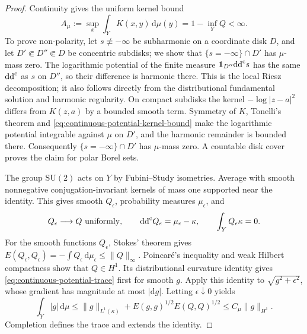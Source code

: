 \begin{proof}
Continuity gives the uniform kernel bound
\begin{equation}\label{eq:continuous-potential-kernel-bound}
 A_\mu:=\sup_x\int_YK(x,y)\,\mathrm d\mu(y)
       =1-\inf_YQ<\infty.
\end{equation}
To prove non-polarity, let $s\not\equiv-\infty$ be subharmonic on a coordinate disk $D$, and let $D'\Subset D''\Subset D$ be concentric subdisks; we show that $\{s=-\infty\}\cap D'$ has $\mu$-mass zero. The logarithmic potential of the finite measure $\mathbf1_{D''}\mathrm{dd}^{\mathrm{c}} s$ has the same $\mathrm{dd}^{\mathrm{c}}$ as $s$ on $D''$, so their difference is harmonic there. This is the local Riesz decomposition; it also follows directly from the distributional fundamental solution and harmonic regularity. On compact subdisks the kernel $-\log|z-a|^2$ differs from $K(z,a)$ by a bounded smooth term. Symmetry of $K$, Tonelli's theorem and \eqref{eq:continuous-potential-kernel-bound} make the logarithmic potential integrable against $\mu$ on $D'$, and the harmonic remainder is bounded there. Consequently $\{s=-\infty\}\cap D'$ has $\mu$-mass zero. A countable disk cover proves the claim for polar Borel sets.

The group $\mathrm{SU}(2)$ acts on $Y$ by Fubini--Study isometries. Average with smooth nonnegative conjugation-invariant kernels of mass one supported near the identity. This gives smooth $Q_\epsilon$, probability measures $\mu_\epsilon$, and
\[
 Q_\epsilon\longrightarrow Q\ \text{uniformly},\qquad
 \ddc Q_\epsilon=\mu_\epsilon-\kappa,\qquad
 \int_YQ_\epsilon\kappa=0.
\]
For the smooth functions $Q_\epsilon$, Stokes' theorem gives $E(Q_\epsilon,Q_\epsilon)=-\int Q_\epsilon\,\mathrm d\mu_\epsilon\leq\|Q\|_\infty$. Poincar\'e's inequality and weak Hilbert compactness show that $Q\in H^1$. Its distributional curvature identity gives \eqref{eq:continuous-potential-trace} first for smooth $g$. Apply this identity to $\sqrt{g^2+\epsilon^2}$, whose gradient has magnitude at most $|\mathrm dg|$. Letting $\epsilon\downarrow0$ yields
\[
 \int_Y|g|\,\mathrm d\mu
 \leq\|g\|_{L^1(\kappa)}+E(g,g)^{1/2}E(Q,Q)^{1/2}
 \leq C_\mu\|g\|_{H^1}.
\]
Completion defines the trace and extends the identity.


\end{proof}
